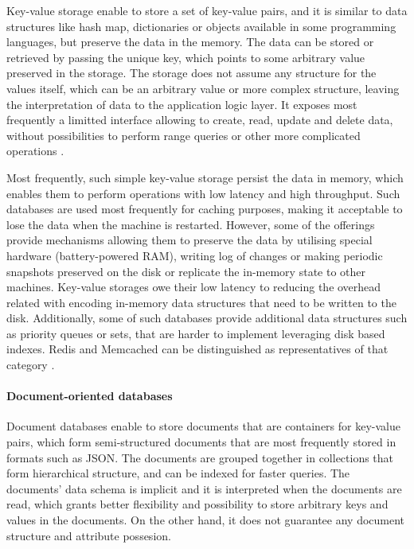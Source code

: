 Key-value storage enable to store a set of key-value pairs, and it is similar to data structures like hash map, dictionaries or objects available in some programming languages, but preserve the data in the memory. The data can be stored or retrieved by passing the unique key, which points to some arbitrary value preserved in the storage.
The storage does not assume any structure for the values itself, which can be an arbitrary value or more complex structure, leaving the interpretation of data to the application logic layer.
It exposes most frequently a limitted interface allowing to create, read, update and delete data, without possibilities to perform range queries or other more complicated operations \cite{NoSQLDatabaseSystemsSurveyDecisionGuidance}.

Most frequently, such simple key-value storage persist the data in memory, which enables them to perform operations with low latency and high throughput. Such databases are used most frequently for caching purposes, making it acceptable to lose the data when the machine is restarted. However, some of the offerings provide mechanisms allowing them to preserve the data by utilising special hardware (battery-powered RAM), writing log of changes or making periodic snapshots preserved on the disk or replicate the in-memory state to other machines. Key-value storages owe their low latency to reducing the overhead related with encoding in-memory data structures that need to be written to the disk. Additionally, some of such databases provide additional data structures such as priority queues or sets, that are harder to implement leveraging disk based indexes. Redis \cite{Redis} and Memcached \cite{Memcached} can be distinguished as representatives of that category \cite{DesignDataIntensiveApplications}. 

\paragraph{Document-oriented databases}

Document databases enable to store documents that are containers for key-value pairs, which form semi-structured documents that are most frequently stored in formats such as JSON. The documents are grouped together in collections that form hierarchical structure, and can be indexed for faster queries. The documents' data schema is implicit and it is interpreted when the documents are read, which grants better flexibility and possibility to store arbitrary keys and values in the documents. On the other hand, it does not guarantee any document structure and attribute possesion.

